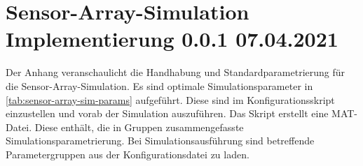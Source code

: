 %

\chapter{Sensor-Array-Simulation Implementierung 0.0.1 07.04.2021}\label{ch:sensor-array-sim-imp}


Der Anhang veranschaulicht die Handhabung und Standardparametrierung für die Sensor-Array-Simulation. Es sind optimale Simulationsparameter in \autoref{tab:sensor-array-sim-params} aufgeführt. Diese sind im Konfigurationsskript einzustellen und vorab der Simulation auszuführen. Das Skript erstellt eine MAT-Datei. Diese enthält, die in Gruppen zusammengefasste Simulationsparametrierung. Bei Simulationsausführung sind betreffende Parametergruppen aus der Konfigurationsdatei zu laden.


